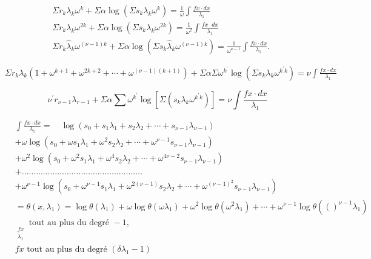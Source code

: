 \documentclass{article}
\begin{document}
\[
\begin{aligned}
& \Sigma r_{k} \lambda_{k} \omega^{k}+\Sigma \alpha \log \left(\Sigma s_{k} \lambda_{k} \omega^{k}\right)=\frac{1}{\omega} \int \frac{f x \cdot d x}{\lambda_{1}} \\
& \Sigma r_{k} \lambda_{k} \omega^{2 k}+\Sigma \alpha \log \left(\Sigma s_{k} \lambda_{k} \omega^{2 k}\right)=\frac{1}{\omega^{2}} \int \frac{f x \cdot d x}{\lambda_{1}} \\
& \Sigma r_{k} \hat{\lambda}_{k} \omega^{(\nu-1) k}+\Sigma \alpha \log \left(\Sigma s_{k} \hat{\lambda}_{k} \omega^{(\nu-1) k}\right)=\frac{1}{\omega^{\nu-1}} \int \frac{f x \cdot d x}{\lambda_{1}} .
\end{aligned}
\]

\(\Sigma r_{k} \lambda_{k}\left(1+\omega^{k+1}+\omega^{2 k+2}+\cdots+\omega^{(\nu-1)(k+1)}\right)+\Sigma \alpha \Sigma \omega^{k^{\prime}} \log \left(\Sigma s_{k} \lambda_{k} \omega^{k^{\prime} k}\right)=\nu \int \frac{f x \cdot d x}{\lambda_{1}}\)

\[
\nu^{\prime} r_{\nu-1} \lambda_{r-1}+\Sigma \alpha \sum \omega^{k^{\prime}} \log \left[\Sigma\left(s_{k} \lambda_{k} \omega^{k^{\prime} k}\right)\right]=\nu \int \frac{f x \cdot d x}{\lambda_{1}}
\]

\[
\begin{aligned}
& \int \frac{f x \cdot d x}{\lambda_{1}}=\quad \log \left(s_{0}+s_{1} \lambda_{1}+s_{2} \lambda_{2}+\cdots+s_{\nu-1} \lambda_{\nu-1}\right) \\
& +\omega \log \left(s_{0}+\omega s_{1} \lambda_{1}+\omega^{2} s_{2} \lambda_{2}+\cdots+\omega^{\nu-1} s_{\nu-1} \lambda_{\nu-1}\right) \\
& +\omega^{2} \log \left(s_{0}+\omega^{2} s_{1} \lambda_{1}+\omega^{4} s_{2} \lambda_{2}+\cdots+\omega^{4 \nu-2} s_{\nu-1} \lambda_{\nu-1}\right) \\
& +\ldots \ldots \ldots \ldots \ldots \ldots \ldots \ldots \ldots \ldots \ldots \ldots \ldots \ldots \ldots \ldots \ldots \\
& +\omega^{\nu-1} \log \left(s_{0}+\omega^{\nu-1} s_{1} \lambda_{1}+\omega^{2(\nu-1)} s_{2} \lambda_{2}+\cdots+\omega^{(\nu-1)^{2}} s_{\nu-1} \lambda_{\nu-1}\right) \\
& =\theta\left(x, \lambda_{1}\right)=\log \theta\left(\lambda_{1}\right)+\omega \log \theta\left(\omega \lambda_{1}\right)+\omega^{2} \log \theta\left(\omega^{2} \lambda_{1}\right)+\cdots+\omega^{\nu-1} \log \theta\left(()^{\nu-1} \lambda_{1}\right) \\
& \underset{\substack{f x \\
\lambda_{1}}}{ } \text { tout au plus du degré }-1 \text {, } \\
& f x \text { tout au plus du degré }\left(\delta \lambda_{1}-1\right)
\end{aligned}
\]
\end{document}
